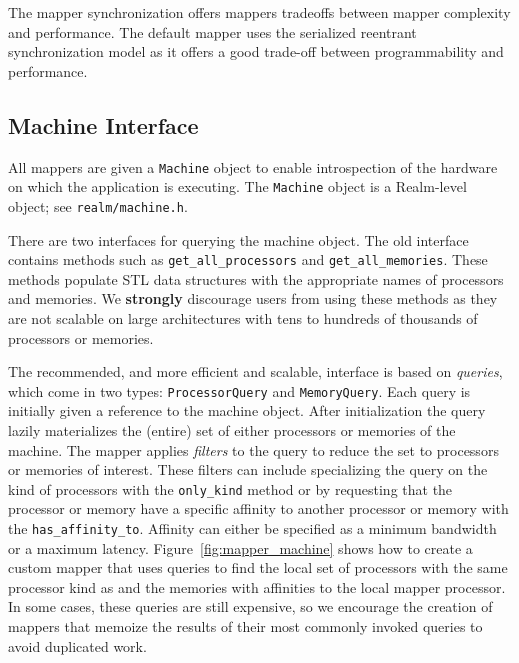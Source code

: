 The mapper synchronization offers mappers tradeoffs between mapper complexity and performance. The default mapper uses the 
serialized reentrant synchronization model as it offers a good trade-off
between programmability and performance.

\subsection{Machine Interface}
\label{subsec:mapping:machine}

All mappers are given a {\tt Machine} object to enable
introspection of the hardware on which the application is executing. The
{\tt Machine} object is a Realm-level object;  see {\tt realm/machine.h}.

There are two interfaces for querying the machine
object. The old interface contains methods such as {\tt get\_all\_processors}
and {\tt get\_all\_memories}. These methods populate STL data structures
with the appropriate names of processors and memories. We {\bf strongly}
discourage users from using these methods as they are not scalable on large
architectures with tens to hundreds of thousands of processors or memories.

The recommended, and more efficient and scalable, interface is based
on {\em queries}, which come in two types: {\tt ProcessorQuery} and 
{\tt MemoryQuery}. Each query is initially given a reference to the machine
object. After initialization the query lazily materializes the (entire) set of 
either processors or memories of the machine.
The mapper applies {\em filters} to the query to reduce the
set to processors or memories of interest.  These filters can include specializing
the query on the kind of processors with the {\tt only\_kind} method or by
requesting that the processor or memory have a specific affinity to another
processor or memory with the {\tt has\_affinity\_to}. Affinity can either be
specified as a minimum bandwidth or a maximum latency. Figure~\ref{fig:mapper_machine}
shows how to create a custom mapper that uses queries to find the local set of 
processors with the same processor kind as and the memories with affinities to the local
mapper processor. In some cases, these queries are still expensive, so we
encourage the creation of mappers that memoize the results of their most 
commonly invoked queries to avoid duplicated work.

